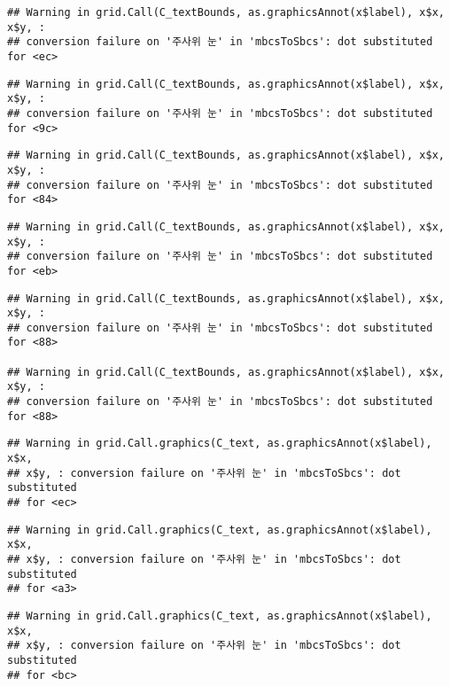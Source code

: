 \documentclass[]{book}
\begin{document}
\begin{verbatim}
## Warning in grid.Call(C_textBounds, as.graphicsAnnot(x$label), x$x, x$y, :
## conversion failure on '주사위 눈' in 'mbcsToSbcs': dot substituted for <ec>
\end{verbatim}

\begin{verbatim}
## Warning in grid.Call(C_textBounds, as.graphicsAnnot(x$label), x$x, x$y, :
## conversion failure on '주사위 눈' in 'mbcsToSbcs': dot substituted for <9c>
\end{verbatim}

\begin{verbatim}
## Warning in grid.Call(C_textBounds, as.graphicsAnnot(x$label), x$x, x$y, :
## conversion failure on '주사위 눈' in 'mbcsToSbcs': dot substituted for <84>
\end{verbatim}

\begin{verbatim}
## Warning in grid.Call(C_textBounds, as.graphicsAnnot(x$label), x$x, x$y, :
## conversion failure on '주사위 눈' in 'mbcsToSbcs': dot substituted for <eb>
\end{verbatim}

\begin{verbatim}
## Warning in grid.Call(C_textBounds, as.graphicsAnnot(x$label), x$x, x$y, :
## conversion failure on '주사위 눈' in 'mbcsToSbcs': dot substituted for <88>

## Warning in grid.Call(C_textBounds, as.graphicsAnnot(x$label), x$x, x$y, :
## conversion failure on '주사위 눈' in 'mbcsToSbcs': dot substituted for <88>
\end{verbatim}

\begin{verbatim}
## Warning in grid.Call.graphics(C_text, as.graphicsAnnot(x$label), x$x,
## x$y, : conversion failure on '주사위 눈' in 'mbcsToSbcs': dot substituted
## for <ec>
\end{verbatim}

\begin{verbatim}
## Warning in grid.Call.graphics(C_text, as.graphicsAnnot(x$label), x$x,
## x$y, : conversion failure on '주사위 눈' in 'mbcsToSbcs': dot substituted
## for <a3>
\end{verbatim}

\begin{verbatim}
## Warning in grid.Call.graphics(C_text, as.graphicsAnnot(x$label), x$x,
## x$y, : conversion failure on '주사위 눈' in 'mbcsToSbcs': dot substituted
## for <bc>
\end{verbatim}
\end{document}
